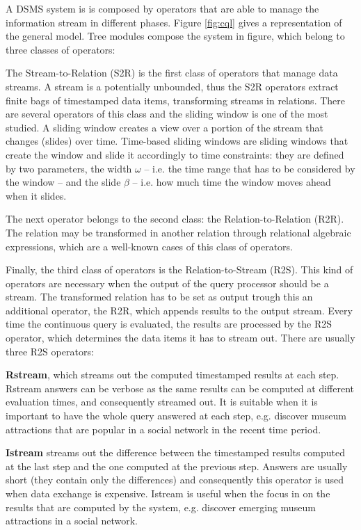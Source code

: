 A DSMS system is is composed by operators that are able to manage the information stream in different phases. Figure \ref{fig:cql} gives a representation of the general model. Tree modules compose the system in figure, which belong to three classes of operators:  

The Stream-to-Relation (S2R) is the first class of operators that manage data streams.  A stream is a potentially unbounded, thus the S2R operators extract finite bags of timestamped data items, transforming streams in relations. There are several operators of this class and the sliding window is one of the most studied. A sliding window creates a view over a portion of the stream that changes (slides) over time. Time-based sliding windows are sliding windows that create the window and slide it accordingly to time constraints: they are defined by two parameters, the width $\omega$ – i.e. the time range that has to be considered by the window – and the slide $\beta$ – i.e. how much time the window moves ahead when it slides.

The next operator belongs to the second class: the Relation-to-Relation (R2R). The relation may be transformed in another relation through relational algebraic expressions, which are a well-known cases of this class of operators. 

Finally, the third class of operators is the Relation-to-Stream (R2S). This kind of operators are necessary when the output of the query processor should be a stream. The transformed relation has to be set as output trough this an additional operator, the R2R, which appends results to the output stream. Every time the continuous query is evaluated, the results are processed by the R2S operator, which determines the data items it has to stream out. There are usually three R2S operators:

\textbf{Rstream}, which streams out the computed timestamped results at each step. Rstream answers can be verbose as the same results can be computed at different evaluation times, and consequently streamed out. It is suitable when it is important to have the whole query answered at each step, e.g. discover museum attractions that are popular in a social network in the recent time period.

\textbf{Istream} streams out the difference between the timestamped results computed at the last step and the one computed at the previous step. Answers are usually short (they contain only the differences) and consequently this operator is used when data exchange is expensive. Istream is useful when the focus in on the results that are computed by the system, e.g. discover emerging museum attractions in a social network.

